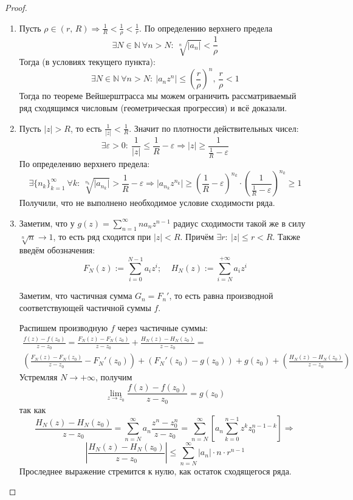 \documentclass[a4paper,12pt]{article}
\renewcommand{\leq}{\ensuremath{\leqslant}}
\renewcommand{\geq}{\ensuremath{\geqslant}}
\theoremstyle{plain}
\theoremstyle{definition}
\theoremstyle{remark}
\begin{document}
\begin{proof}
	\begin{enumerate}
		\item Пусть $\rho \in (r,\, R) \Rightarrow \frac{1}{R} < \frac{1}{\rho} < \frac{1}{r}$. По определению верхнего предела
		      \[
			      \exists N \in \mathbb{N} \: \forall n > N :\: \sqrt[n]{\vert a_n\vert} < \frac{1}{\rho}
		      \]
		      Тогда (в условиях текущего пункта):
		      \[
			      \exists N \in \mathbb{N} \: \forall n > N :\: \vert a_nz^n\vert \leq \left(\frac{r}{\rho}\right)^n,\, \frac{r}{\rho} < 1
		      \]
		      Тогда по теореме Вейшерштрасса мы можем ограничить рассматриваемый ряд сходящимся числовым (геометрическая прогрессия) и всё доказали.
		\item Пусть $\vert z\vert > R$, то есть $\frac{1}{\vert z\vert} < \frac{1}{R}$. Значит по плотности действительных чисел:
		      \[
			      \exists \varepsilon > 0 :\: \frac{1}{\vert z\vert} \leq \frac{1}{R} - \varepsilon \Rightarrow \vert z\vert \geq \frac{1}{\frac{1}{R} - \varepsilon}
		      \]
		      По определению верхнего предела:
		      \[
			      \exists \{n_k\}_{k = 1}^\infty \: \forall k :\: \sqrt[n_k]{\vert a_{n_k}\vert} > \frac{1}{R} - \varepsilon \Rightarrow \vert a_{n_k}z^{n_k}\vert \geq \left(\frac{1}{R} - \varepsilon\right)^{n_k}\cdot\left(\frac{1}{\frac{1}{R} - \varepsilon}\right)^{n_k} \geq 1
		      \]
		      Получили, что не выполнено необходимое условие сходимости ряда.
		\item Заметим, что у $g(z) = \sum_{n = 1}^\infty na_nz^{n-1}$ радиус сходимости такой же в силу $\sqrt[n]{n} \to 1$, то есть ряд сходится при $\vert z\vert < R$. Причём $\exists r :\: \vert z\vert \leq r < R$. Также введём обозначения:
		      \[
			      F_N(z) := \sum_{i = 0}^{N - 1} a_iz^i;\;\;\;\; H_N(z) := \sum_{i = N}^{+\infty} a_iz^i
		      \]

		      Заметим, что частичная сумма $G_n = F_n'$, то есть равна производной соответствующей частичной суммы $f$.

		      Распишем производную $f$ через частичные суммы:
		      \begin{align*}
			      \frac{f(z) - f(z_0)}{z - z_0} = \frac{F_N(z) - F_N(z_0)}{z - z_0} + \frac{H_N(z) - H_N(z_0)}{z - z_0} = \\
			      \left(\frac{F_N(z) - F_N(z_0)}{z - z_0}  - F_N'(z_0)\right) + (F_N'(z_0) - g(z_0)) + g(z_0) + \left(\frac{H_N(z) - H_N(z_0)}{z - z_0}\right)
		      \end{align*}
		      Устремляя $N \to +\infty$, получим
		      \[
			      \lim_{z \to z_0} \frac{f(z) - f(z_0)}{z - z_0} = g(z_0)
		      \]
		      так как
		      \[
			      \frac{H_N(z) - H_N(z_0)}{z - z_0} = \sum_{n = N}^\infty a_n\frac{z^n - z^n_0}{z - z_0} = \sum_{n = N}^\infty \left[a_n\sum_{k =0}^{n-1}z^kz_0^{n - 1 - k}\right] \Rightarrow
		      \]
		      \[
			      \left\vert\frac{H_N(z) - H_N(z_0)}{z - z_0}\right\vert \leq \sum_{n = N}^\infty \vert a_n\vert\cdot n\cdot r^{n - 1}
		      \]
		      Проследнее выражение стремится к нулю, как остаток сходящегося ряда.
	\end{enumerate}

\end{proof}
\end{document}
